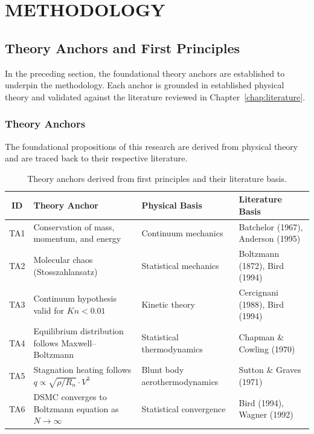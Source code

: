 \clearpage
\chapter{METHODOLOGY}
\label{ch:methodology}

\section{Theory Anchors and First Principles}
\label{sec:theory_anchors}

In the preceding section, the foundational theory anchors are established to underpin the methodology. Each anchor is grounded in established physical theory and validated against the literature reviewed in Chapter~\ref{chap:literature}.



\subsection{Theory Anchors}
The foundational propositions of this research are derived from physical theory and are traced back to their respective literature.

\begin{table}[H]
\centering
\caption{Theory anchors derived from first principles and their literature basis.}
\label{tab:theory_anchors}
\begin{tabularx}{\textwidth}{@{}c >{\RaggedRight\arraybackslash}X >{\RaggedRight\arraybackslash}p{} >{\RaggedRight\arraybackslash}p{}@{}}
\toprule
\textbf{ID} & \textbf{Theory Anchor} & \textbf{Physical Basis} & \textbf{Literature Basis} \\ \midrule
TA1 & Conservation of mass, momentum, and energy & Continuum mechanics & Batchelor (1967), Anderson (1995) \\
TA2 & Molecular chaos (Stosszahlansatz) & Statistical mechanics & Boltzmann (1872), Bird (1994) \\
TA3 & Continuum hypothesis valid for $Kn < 0.01$ & Kinetic theory & Cercignani (1988), Bird (1994) \\
TA4 & Equilibrium distribution follows Maxwell--Boltzmann & Statistical thermodynamics & Chapman \& Cowling (1970) \\
TA5 & Stagnation heating follows $q \propto \sqrt{\rho/R_n} \cdot V^3$ & Blunt body aerothermodynamics & Sutton \& Graves (1971) \\
TA6 & DSMC converges to Boltzmann equation as $N \to \infty$ & Statistical convergence & Bird (1994), Wagner (1992) \\
\bottomrule
\end{tabularx}
\end{table}

